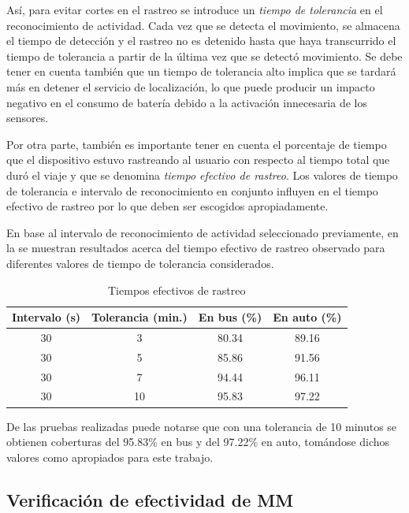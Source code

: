 Así, para evitar cortes en el rastreo se introduce un \emph{tiempo de tolerancia} en el reconocimiento de actividad. Cada vez que se detecta el movimiento, se almacena el tiempo de detección y el rastreo no es detenido hasta que haya transcurrido el tiempo de tolerancia a partir de la última vez que se detectó movimiento. Se debe tener en cuenta también que un tiempo de tolerancia alto implica que se tardará más en detener el servicio de localización, lo que puede producir un impacto negativo en el consumo de batería debido a la activación innecesaria de los sensores.

Por otra parte, también es importante tener en cuenta el porcentaje de tiempo que el dispositivo estuvo rastreando al usuario con respecto al tiempo total que duró el viaje y que se denomina \emph{tiempo efectivo de rastreo}. Los valores de tiempo de tolerancia e intervalo de reconocimiento en conjunto influyen en el tiempo efectivo de rastreo por lo que deben ser escogidos apropiadamente.

En base al intervalo de reconocimiento de actividad seleccionado previamente, en la  se muestran resultados acerca del tiempo efectivo de rastreo observado para diferentes valores de tiempo de tolerancia considerados. 

\begin{table}[h]
	\centering
	\begin{tabular}{cccc}
		\toprule
		Intervalo (s) & Tolerancia (min.) & En bus (\%) & En auto (\%) \\
		\midrule
		30            & 3                 & 80.34         & 89.16 \\
		30            & 5                 & 85.86         & 91.56 \\
		30            & 7                & 94.44         & 96.11  \\
		30            & 10                & 95.83         & 97.22 \\
		\bottomrule
	\end{tabular}
	\caption{Tiempos efectivos de rastreo}
	\label{tab:prom_tiempo_efectivo_rastreo}
\end{table}

De las pruebas realizadas puede notarse que con una tolerancia de 10 minutos se obtienen coberturas del 95.83\% en bus y del 97.22\% en auto, tomándose dichos valores como apropiados para este trabajo.

\subsection{Verificación de efectividad de MM}

